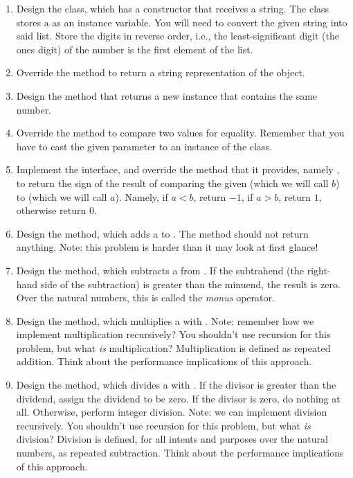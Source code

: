 \begin{enumerate}[label=(\alph*)]
    \item Design the  class, which has a constructor that receives a string. The  class stores a  as an instance variable. You will need to convert the given string into said list. Store the digits in reverse order, i.e., the least-significant digit (the ones digit) of the number is the first element of the list.
    \item Override the  method to return a string representation of the  object. 
    \item Design the  method that returns a new  instance that contains the same number.
    \item Override the  method to compare two  values for equality. Remember that you have to cast the given parameter to an instance of the  class. 
    \item Implement the  interface, and override the method that it provides, namely , to return the sign of the result of comparing the given  (which we will call $b$) to   (which we will call $a$). Namely, if $a < b$, return $-1$, if $a > b$, return $1$, otherwise return $0$.
    \item Design the  method, which adds a  to  . The method should not return anything. Note: this problem is harder than it may look at first glance!
    \item Design the  method, which subtracts a  from  . If the subtrahend (the right-hand side of the subtraction) is greater than the minuend, the result is zero. Over the natural numbers, this is called the \emph{monus} operator.
    \item Design the  method, which multiplies a  with  . Note: remember how we implement multiplication recursively? You shouldn't use recursion for this problem, but what \emph{is} multiplication? Multiplication is defined as repeated addition. Think about the performance implications of this approach.
    \item Design the  method, which divides a  with  . If the divisor is greater than the dividend, assign the dividend to be zero. If the divisor is zero, do nothing at all. Otherwise, perform integer division. Note: we can implement division recursively. You shouldn't use recursion for this problem, but what \emph{is} division? Division is defined, for all intents and purposes over the natural numbers, as repeated subtraction. Think about the performance implications of this approach.
\end{enumerate}

